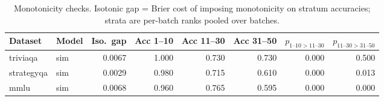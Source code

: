 \begin{table}[t]
\centering
\small
\begin{tabular}{llrrrrrr}
\toprule
Dataset & Model & Iso.\ gap & Acc 1--10 & Acc 11--30 & Acc 31--50 & $p_{1\text{--}10>11\text{--}30}$ & $p_{11\text{--}30>31\text{--}50}$ \\
\midrule
triviaqa & sim & 0.0067 & 1.000 & 0.730 & 0.730 & 0.000 & 0.500 \\
strategyqa & sim & 0.0029 & 0.980 & 0.715 & 0.610 & 0.000 & 0.013 \\
mmlu & sim & 0.0068 & 0.960 & 0.765 & 0.595 & 0.000 & 0.000 \\
\bottomrule
\end{tabular}
\caption{Monotonicity checks. Isotonic gap = Brier cost of imposing monotonicity on stratum accuracies; strata are per-batch ranks pooled over batches.}
\label{tab:mono}
\end{table}
